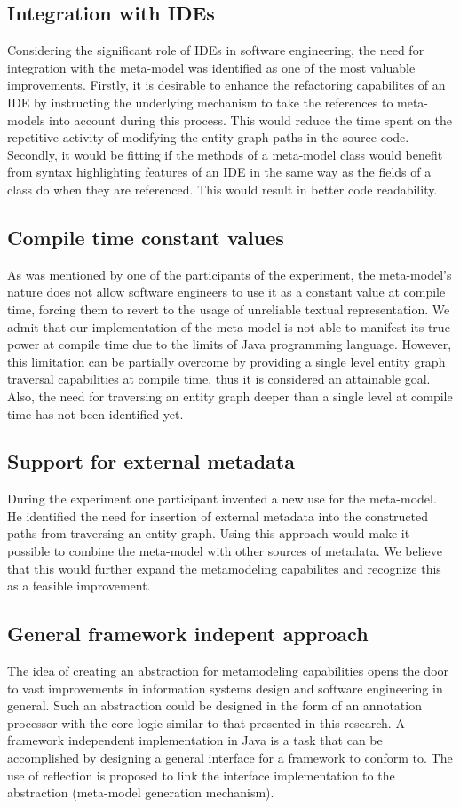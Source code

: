 \subsection{Integration with IDEs}
Considering the significant role of IDEs in software engineering, the need for integration with the meta-model was identified as one of the most valuable improvements.
Firstly, it is desirable to enhance the refactoring capabilites of an IDE by instructing the underlying mechanism to take the references to meta-models into account during this process.
This would reduce the time spent on the repetitive activity of modifying the entity graph paths in the source code.
Secondly, it would be fitting if the methods of a meta-model class would benefit from syntax highlighting features of an IDE in the same way as the fields of a class do when they are referenced.
This would result in better code readability.

\subsection{Compile time constant values}
As was mentioned by one of the participants of the experiment, the meta-model's nature does not allow software engineers to use it as a constant value at compile time, forcing them to revert to the usage of unreliable textual representation.
We admit that our implementation of the meta-model is not able to manifest its true power at compile time due to the limits of Java programming language.
However, this limitation can be partially overcome by providing a single level entity graph traversal capabilities at compile time, thus it is considered an attainable goal.
Also, the need for traversing an entity graph deeper than a single level at compile time has not been identified yet.

\subsection{Support for external metadata}
During the experiment one participant invented a new use for the meta-model.
He identified the need for insertion of external metadata into the constructed paths from traversing an entity graph.
Using this approach would make it possible to combine the meta-model with other sources of metadata.
We believe that this would further expand the metamodeling capabilites and recognize this as a feasible improvement.

\subsection{General framework indepent approach}
The idea of creating an abstraction for metamodeling capabilities opens the door to vast improvements in information systems design and software engineering in general.
Such an abstraction could be designed in the form of an annotation processor with the core logic similar to that presented in this research.
A framework independent implementation in Java is a task that can be accomplished by designing a general interface for a framework to conform to.
The use of reflection is proposed to link the interface implementation to the abstraction (meta-model generation mechanism).
